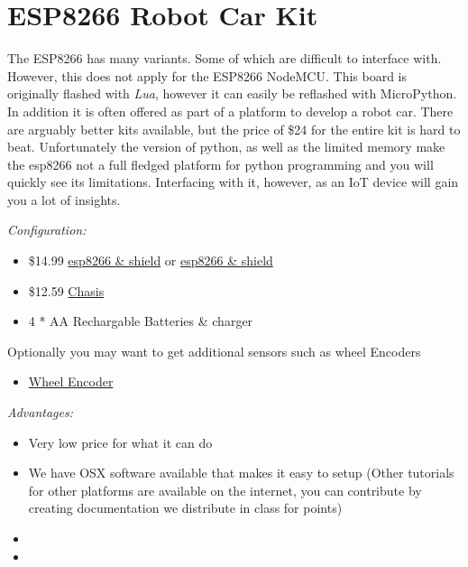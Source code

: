 \section{ESP8266 Robot Car Kit}\label{esp8266-robot-car-kit}

The ESP8266 has many variants. Some of which are difficult to interface
with. However, this does not apply for the ESP8266 NodeMCU. This board
is originally flashed with \emph{Lua}, however it can easily be
reflashed with MicroPython. In addition it is often offered as part of a
platform to develop a robot car. There are arguably better kits
available, but the price of \$24 for the entire kit is hard to beat.
Unfortunately the version of python, as well as the limited memory make
the esp8266 not a full fledged platform for python programming and you
will quickly see its limitations. Interfacing with it, however, as an
IoT device will gain you a lot of insights.

\emph{Configuration:}

\begin{itemize}
\tightlist
\item
  \$14.99
  \href{https://www.amazon.com/KOOKYE-ESP8266-NodeMcu-ESP-12E-Expansion/dp/B01C6MR62E/ref=sr_1_1?ie=UTF8\&qid=1499251895\&sr=8-1\&keywords=esp8266+robot+car}{esp8266
  \& shield} or
  \href{https://www.amazon.com/Makerfocus-ESP8266-ESP-12E-Development-Expansion/dp/B01MU4XQUN/ref=sr_1_2?ie=UTF8\&qid=1499252002\&sr=8-2\&keywords=esp8266+motor+shield}{esp8266
  \& shield}
\item
  \$12.59
  \href{https://www.amazon.com/Emgreat-Chassis-Encoder-wheels-Battery/dp/B00GLO5SMY/ref=pd_rhf_se_s_cp_10?_encoding=UTF8\&pd_rd_i=B00GLO5SMY\&pd_rd_r=77XYGK6BE54FGDTGQ0AC\&pd_rd_w=FNQFl\&pd_rd_wg=wKMdb\&psc=1\&refRID=77XYGK6BE54FGDTGQ0AC}{Chasis}
\item
  4 * AA Rechargable Batteries \& charger
\end{itemize}

Optionally you may want to get additional sensors such as wheel Encoders

\begin{itemize}
\tightlist
\item
  \href{https://www.amazon.com/Wheel-Encoder-Kit-Robot-Car/dp/B00NPWGEIM/ref=sr_1_4?s=toys-and-games\&ie=UTF8\&qid=1499254488\&sr=1-4\&keywords=speed+sensor+robot+car+wheel}{Wheel
  Encoder}
\end{itemize}

\emph{Advantages:}

\begin{itemize}
\item
  Very low price for what it can do
\item
  We have OSX software available that makes it easy to setup (Other
  tutorials for other platforms are available on the internet, you can
  contribute by creating documentation we distribute in class for
  points)
\item
\item
\end{itemize}

